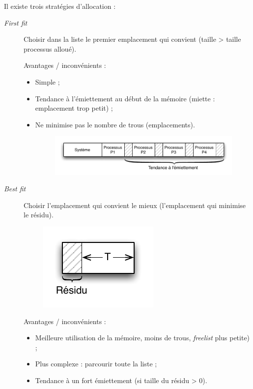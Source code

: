 \documentclass[11pt,english,french]{scrreprt}
\theoremstyle{remark}
\theoremstyle{definition}
\newcommand*\Pitem{%
  \item[\color{green}\scalebox{0.9}{\textbullet}]}
\newcommand*\Citem{%
  \item[\color{red}\scalebox{0.9}{\textbullet}]}
\begin{document}
Il existe trois stratégies d'allocation :
\begin{description}
	\item [\emph{First fit}] Choisir dans la liste le premier emplacement qui convient (taille > taille processus alloué).
	 
Avantages / inconvénients : \begin{itemize}
	\Pitem Simple ;
	\Citem Tendance à l'émiettement au début de la mémoire (miette : emplacement trop petit) ;
	\Citem Ne minimise pas le nombre de trous (emplacements).
	\begin{figure}[h!]
		\center
		\vspace{-10pt}
		\includegraphics[scale=.85]{img/firstfit}
		\vspace{-15pt}
	\end{figure}
\end{itemize}

	\item [\emph{Best fit}] Choisir l'emplacement qui convient le mieux (l'emplacement qui minimise le résidu).
	
	\begin{figure}[h!]
		\center
		\vspace{-10pt}
		\includegraphics[scale=.85]{img/bestfit}
		\vspace{-15pt}
	\end{figure}

Avantages / inconvénients :\begin{itemize}
	\Pitem Meilleure utilisation de la mémoire, moins de trous, \emph{freelist} plus petite) ;
	\Citem Plus complexe : parcourir toute la liste ;
	\Citem Tendance à un fort émiettement (si taille du résidu > 0).
\end{itemize}


\end{description}
\end{document}
